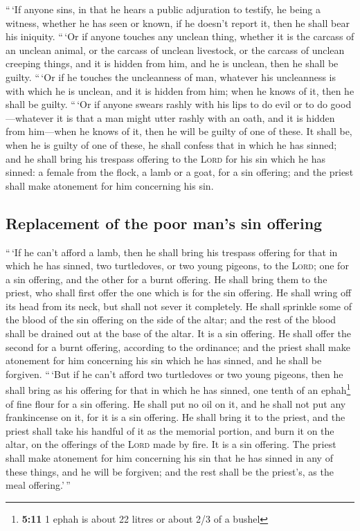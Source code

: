  ``\,`If anyone sins, in that he hears a public adjuration
to testify, he being a witness, whether he has seen or known, if he
doesn't report it, then he shall bear his iniquity. 
``\,`Or if anyone touches any unclean thing, whether it is the carcass
of an unclean animal, or the carcass of unclean livestock, or the
carcass of unclean creeping things, and it is hidden from him, and he is
unclean, then he shall be guilty.  ``\,`Or if he touches
the uncleanness of man, whatever his uncleanness is with which he is
unclean, and it is hidden from him; when he knows of it, then he shall
be guilty.  ``\,`Or if anyone swears rashly with his lips
to do evil or to do good---whatever it is that a man might utter rashly
with an oath, and it is hidden from him---when he knows of it, then he
will be guilty of one of these.  It shall be, when he is
guilty of one of these, he shall confess that in which he has sinned;
 and he shall bring his trespass offering to the
\textsc{Lord} for his sin which he has sinned: a female from the flock,
a lamb or a goat, for a sin offering; and the priest shall make
atonement for him concerning his sin.

\hypertarget{replacement-of-the-poor-mans-sin-offering}{%
\subsection{Replacement of the poor man's sin
offering}\label{replacement-of-the-poor-mans-sin-offering}}

 ``\,`If he can't afford a lamb, then he shall bring his
trespass offering for that in which he has sinned, two turtledoves, or
two young pigeons, to the \textsc{Lord}; one for a sin offering, and the
other for a burnt offering.  He shall bring them to the
priest, who shall first offer the one which is for the sin offering. He
shall wring off its head from its neck, but shall not sever it
completely.  He shall sprinkle some of the blood of the
sin offering on the side of the altar; and the rest of the blood shall
be drained out at the base of the altar. It is a sin offering.
 He shall offer the second for a burnt offering,
according to the ordinance; and the priest shall make atonement for him
concerning his sin which he has sinned, and he shall be forgiven.
 ``\,`But if he can't afford two turtledoves or two young
pigeons, then he shall bring as his offering for that in which he has
sinned, one tenth of an ephah\footnote{\textbf{5:11} 1 ephah is about 22
  litres or about 2/3 of a bushel} of fine flour for a sin offering. He
shall put no oil on it, and he shall not put any frankincense on it, for
it is a sin offering.  He shall bring it to the priest,
and the priest shall take his handful of it as the memorial portion, and
burn it on the altar, on the offerings of the \textsc{Lord} made by
fire. It is a sin offering.  The priest shall make
atonement for him concerning his sin that he has sinned in any of these
things, and he will be forgiven; and the rest shall be the priest's, as
the meal offering.'\,''

